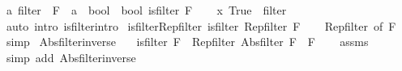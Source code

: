 \begin{isabellebody}
\isanewline
{}\isamarkupfalse%
\ {\isacharprime}{\kern0pt}a\ filter\ {\isacharequal}{\kern0pt}\ {\isachardoublequoteopen}{\isacharbraceleft}{\kern0pt}F\ {\isacharcolon}{\kern0pt}{\isacharcolon}{\kern0pt}\ {\isacharparenleft}{\kern0pt}{\isacharprime}{\kern0pt}a\ {\isasymRightarrow}\ bool{\isacharparenright}{\kern0pt}\ {\isasymRightarrow}\ bool{\isachardot}{\kern0pt}\ is{\isacharunderscore}{\kern0pt}filter\ F{\isacharbraceright}{\kern0pt}{\isachardoublequoteclose}\isanewline
%
\isadelimproof
%
\endisadelimproof
%
\isatagproof
{}\isamarkupfalse%
\isanewline
\ \ \isamarkupfalse%
\ {\isachardoublequoteopen}{\isacharparenleft}{\kern0pt}{\isasymlambda}x{\isachardot}{\kern0pt}\ True{\isacharparenright}{\kern0pt}\ {\isasymin}\ {\isacharquery}{\kern0pt}filter{\isachardoublequoteclose}\ \isamarkupfalse%
\ {\isacharparenleft}{\kern0pt}auto\ intro{\isacharcolon}{\kern0pt}\ is{\isacharunderscore}{\kern0pt}filter{\isachardot}{\kern0pt}intro{\isacharparenright}{\kern0pt}\isanewline
{}\isamarkupfalse%
%
\endisatagproof
{\isafoldproof}%
%
\isadelimproof
\isanewline
%
\endisadelimproof
\isanewline
{}\isamarkupfalse%
\ is{\isacharunderscore}{\kern0pt}filter{\isacharunderscore}{\kern0pt}Rep{\isacharunderscore}{\kern0pt}filter{\isacharcolon}{\kern0pt}\ {\isachardoublequoteopen}is{\isacharunderscore}{\kern0pt}filter\ {\isacharparenleft}{\kern0pt}Rep{\isacharunderscore}{\kern0pt}filter\ F{\isacharparenright}{\kern0pt}{\isachardoublequoteclose}\isanewline
%
\isadelimproof
\ \ %
\endisadelimproof
%
\isatagproof
{}\isamarkupfalse%
\ Rep{\isacharunderscore}{\kern0pt}filter\ {\isacharbrackleft}{\kern0pt}of\ F{\isacharbrackright}{\kern0pt}\ \isamarkupfalse%
\ simp%
\endisatagproof
{\isafoldproof}%
%
\isadelimproof
\isanewline
%
\endisadelimproof
\isanewline
{}\isamarkupfalse%
\ Abs{\isacharunderscore}{\kern0pt}filter{\isacharunderscore}{\kern0pt}inverse{\isacharprime}{\kern0pt}{\isacharcolon}{\kern0pt}\isanewline
\ \ \ {\isachardoublequoteopen}is{\isacharunderscore}{\kern0pt}filter\ F{\isachardoublequoteclose}\ \ {\isachardoublequoteopen}Rep{\isacharunderscore}{\kern0pt}filter\ {\isacharparenleft}{\kern0pt}Abs{\isacharunderscore}{\kern0pt}filter\ F{\isacharparenright}{\kern0pt}\ {\isacharequal}{\kern0pt}\ F{\isachardoublequoteclose}\isanewline
%
\isadelimproof
\ \ %
\endisadelimproof
%
\isatagproof
{}\isamarkupfalse%
\ assms\ \isamarkupfalse%
\ {\isacharparenleft}{\kern0pt}simp\ add{\isacharcolon}{\kern0pt}\ Abs{\isacharunderscore}{\kern0pt}filter{\isacharunderscore}{\kern0pt}inverse{\isacharparenright}{\kern0pt}%

\end{isabellebody}
